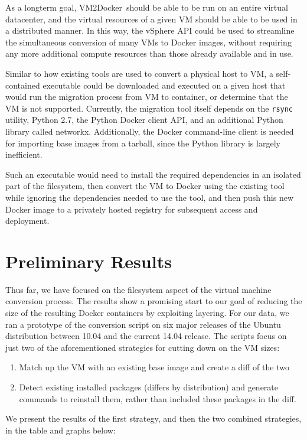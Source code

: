 \documentclass[\myfontsize, letterpaper]{article}
\newcommand{\projectname}{VM2Docker}
\begin{document}
As a longterm goal, \projectname\ should be able to be run on an entire virtual datacenter, and the virtual resources of a given VM should be able to be used in a distributed manner. In this way, the vSphere API could be used to streamline the simultaneous conversion of many VMs to Docker images, without requiring any more additional compute resources than those already available and in use.

Similar to how existing tools are used to convert a physical host to VM, a self-contained executable could be downloaded and executed on a given host that would run the migration process from VM to container, or determine that the VM is not supported. Currently, the migration tool itself depends on the \texttt{rsync} utility, Python 2.7, the Python Docker client API, and an additional Python library called networkx. Additionally, the Docker command-line client is needed for importing base images from a tarball, since the Python library is largely inefficient.

Such an executable would need to install the required dependencies in an isolated part of the filesystem, then convert the VM to Docker using the existing tool while ignoring the dependencies needed to use the tool, and then push this new Docker image to a privately hosted registry for subsequent access and deployment.

\section{Preliminary Results}
\label{sec:results}
Thus far, we have focused on the filesystem aspect of the virtual machine conversion process. The results show a promising start to our goal of reducing the size of the resulting Docker containers by exploiting layering. For our data, we ran a prototype of the conversion script on six major releases of the Ubuntu distribution between 10.04 and the current 14.04 release. The scripts focus on just two of the aforementioned strategies for cutting down on the VM sizes:

\begin{enumerate}
\item Match up the VM with an existing base image and create a diff of the two
\item Detect existing installed packages (differs by distribution) and generate commands to reinstall them, rather than included these packages in the diff.
\end{enumerate}

We present the results of the first strategy, and then the two combined strategies, in the table and graphs below:
\end{document}
